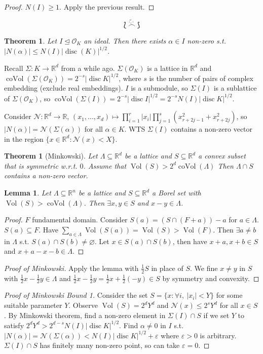 \documentclass{article}
\theoremstyle{definition}
\theoremstyle{remark}
\theoremstyle{plain}
\newtheorem{lem}[defn]{Lemma}
\newtheorem{thm}[defn]{Theorem}
\newcommand{\RR}{\mathbb{R}}
\newcommand{\disc}{\operatorname{disc}}
\newcommand{\e}{\varepsilon}
\begin{document}
\begin{proof}
    $N(I)\ge 1$. Apply the previous result.
\end{proof}
\[\Lbag\tilde{\overset{\cdot.\cdot}{\frown}}\Rbag\tag{Owen's Signature}\]
\begin{thm}
    Let $I\trianglelefteq\mathcal O_K$ an ideal. Then there exists $\alpha\in I$ non-zero s.t. $|N(\alpha)|\le N(I)|\disc(K)|^{1/2}$.
\end{thm}
Recall $\Sigma:K\to\RR^d$ from a while ago. $\Sigma(\mathcal O_K)$ is a lattice in $\RR^d$ and $\operatorname{coVol}(\Sigma(\mathcal O_K))=2^{-s}|\disc K|^{1/2}$, where $s$ is the number of pairs of complex embedding (exclude real embeddings).
$I$ is a submodule, so $\Sigma(I)$ is a sublattice of $\Sigma(\mathcal O_K)$, so $\operatorname{coVol}(\Sigma(I))=2^{-s}|\disc I|^{1/2}=2^{-s}N(I)|\disc K|^{1/2}$.

Consider $\mathcal N:\RR^d\to\RR$, $(x_1,...,x_d)\mapsto\prod_{i=1}^r|x_i|\prod_{j=1}^s(x_{r+2j-1}^2+x_{r+2j}^2)$, so $|N(\alpha)|=\mathcal N(\Sigma(\alpha))$ for all $\alpha\in K$. WTS $\Sigma(I)$ contains a non-zero vector in the region $\{x\in\RR^d:\mathcal N(x)<X\}$.
\begin{thm}[Minkowski]
    Let $\Lambda\subseteq\RR^d$ be a lattice and $S\subseteq\RR^d$ a convex subset that is symmetric w.r.t. $0$. Assume that $\operatorname{Vol}(S)>2^d\operatorname{coVol}(\Lambda)$ Then $\Lambda\cap S$ contains a non-zero vector.
\end{thm}
\begin{lem}
    Let $\Lambda\subseteq \RR^n$ be a lattice and $S\subseteq\RR^d$ a Borel set with $\operatorname{Vol}(S)>\operatorname{coVol}(\Lambda)$. Then $\exists x,y\in S$ and $x-y\in\Lambda$.
\end{lem}
\begin{proof}
    $F$ fundamental domain. Consider $S(a)=(S\cap (F+a))-a$ for $a\in\Lambda$. $S(a)\subseteq F$. Have $\sum_{a\in\Lambda}\operatorname{Vol}(S(a))=\operatorname{Vol}(S)>\operatorname{Vol}(F)$. Then $\exists a\neq b$ in $\Lambda$ s.t. $S(a)\cap S(b)\neq\varnothing$. Let $x\in S(a)\cap S(b)$, then have $x+a,x+b\in S$ and $x+a-x-b\in\Lambda$.
\end{proof}
\begin{proof}[Proof of Minkowski]
    Apply the lemma with $\frac12S$ in place of $S$. We fine $x\neq y$ in $S$ with $\frac12x-\frac12 y\in\Lambda$ and $\frac12x-\frac12y=\frac12x+\frac12(-y)\in S$ by symmetry and convexity.
\end{proof}
\begin{proof}[Proof of Minkowski Bound 1]
    Consider the set $S=\{x:\forall i,\ |x_i|<Y\}$ for some suitable parameter $Y$. Observe $\operatorname{Vol}(S)=2^dY^d$ and $\mathcal N(x)\le 2^sY^d$ for all $x\in S$. By Minkowski theorem, find a non-zero element in $\Sigma(I)\cap S$ if we set $Y$ to satisfy $2^dY^d>2^{d-s}N(I)|\disc K|^{1/2}$. Find $\alpha\neq 0$ in $I$ s.t. $|N(\alpha)|=\mathcal N(\Sigma(\alpha))<N(I)|\disc K|^{1/2}+\e$ where $\e>0$ is arbitrary. $\Sigma(I)\cap S$ has finitely many non-zero point, so can take $\e=0$.
\end{proof}
\end{document}
